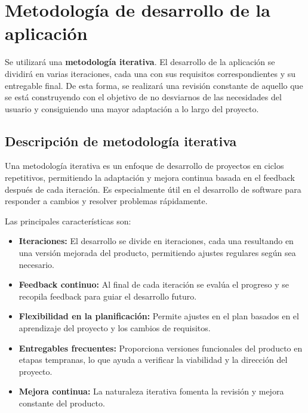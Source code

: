 \section{Metodología de desarrollo de la aplicación}

Se utilizará una \textbf{metodología iterativa}. El desarrollo de la aplicación se dividirá en varias iteraciones, cada una con sus requisitos correspondientes y su entregable final. De esta forma, se realizará una revisión constante de aquello que se está construyendo con el objetivo de no desviarnos de las necesidades del usuario y consiguiendo una mayor adaptación a lo largo del proyecto. 

\subsection{Descripción de metodología iterativa}

Una metodología iterativa es un enfoque de desarrollo de proyectos en ciclos repetitivos, permitiendo la adaptación y mejora continua basada en el feedback después de cada iteración. Es especialmente útil en el desarrollo de software para responder a cambios y resolver problemas rápidamente. \cite{agile}

Las principales características son: 

\begin{itemize}
	\item \textbf{Iteraciones: } El desarrollo se divide en iteraciones, cada una resultando en una versión mejorada del producto, permitiendo ajustes regulares según sea necesario.
	\item \textbf{Feedback continuo: } Al final de cada iteración se evalúa el progreso y se recopila feedback para guiar el desarrollo futuro.
	\item \textbf{Flexibilidad en la planificación: } Permite ajustes en el plan basados en el aprendizaje del proyecto y los cambios de requisitos. 
	\item \textbf{Entregables frecuentes: } Proporciona versiones funcionales del producto en etapas tempranas, lo que ayuda a verificar la viabilidad y la dirección del proyecto. 
	\item \textbf{Mejora continua: } La naturaleza iterativa fomenta la revisión y mejora constante del producto. 
\end{itemize}
